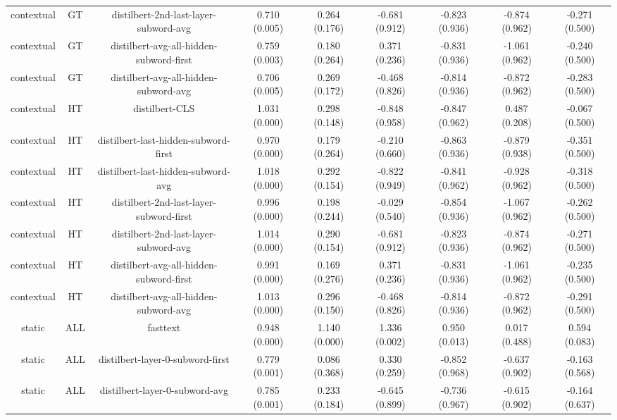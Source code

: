 \begin{sidewaystable}[htb]
\begin{tabular}{@{}ccccccccc@{}}
        contextual & GT & distilbert-2nd-last-layer-subword-avg & 0.710 (0.005) & 0.264 (0.176) & -0.681 (0.912) & -0.823 (0.936) & -0.874 (0.962) & -0.271 (0.500) \\
        contextual & GT & distilbert-avg-all-hidden-subword-first & 0.759 (0.003) & 0.180 (0.264) & 0.371 (0.236) & -0.831 (0.936) & -1.061 (0.962) & -0.240 (0.500) \\
        contextual & GT & distilbert-avg-all-hidden-subword-avg & 0.706 (0.005) & 0.269 (0.172) & -0.468 (0.826) & -0.814 (0.936) & -0.872 (0.962) & -0.283 (0.500) \\
        contextual & HT & distilbert-CLS & 1.031 (0.000) & 0.298 (0.148) & -0.848 (0.958) & -0.847 (0.962) & 0.487 (0.208) & -0.067 (0.500) \\
        contextual & HT & distilbert-last-hidden-subword-first & 0.970 (0.000) & 0.179 (0.264) & -0.210 (0.660) & -0.863 (0.936) & -0.879 (0.938) & -0.351 (0.500) \\
        contextual & HT & distilbert-last-hidden-subword-avg & 1.018 (0.000) & 0.292 (0.154) & -0.822 (0.949) & -0.841 (0.962) & -0.928 (0.962) & -0.318 (0.500) \\
        contextual & HT & distilbert-2nd-last-layer-subword-first & 0.996 (0.000) & 0.198 (0.244) & -0.029 (0.540) & -0.854 (0.936) & -1.067 (0.962) & -0.262 (0.500) \\
        contextual & HT & distilbert-2nd-last-layer-subword-avg & 1.014 (0.000) & 0.290 (0.154) & -0.681 (0.912) & -0.823 (0.936) & -0.874 (0.962) & -0.271 (0.500) \\
        contextual & HT & distilbert-avg-all-hidden-subword-first & 0.991 (0.000) & 0.169 (0.276) & 0.371 (0.236) & -0.831 (0.936) & -1.061 (0.962) & -0.235 (0.500) \\
        contextual & HT & distilbert-avg-all-hidden-subword-avg & 1.013 (0.000) & 0.296 (0.150) & -0.468 (0.826) & -0.814 (0.936) & -0.872 (0.962) & -0.291 (0.500) \\
        static & ALL & fasttext & 0.948 (0.000) & 1.140 (0.000) & 1.336 (0.002) & 0.950 (0.013) & 0.017 (0.488) & 0.594 (0.083) \\
        static & ALL & distilbert-layer-0-subword-first & 0.779 (0.001) & 0.086 (0.368) & 0.330 (0.259) & -0.852 (0.968) & -0.637 (0.902) & -0.163 (0.568) \\
        static & ALL & distilbert-layer-0-subword-avg & 0.785 (0.001) & 0.233 (0.184) & -0.645 (0.899) & -0.736 (0.967) & -0.615 (0.902) & -0.164 (0.637) \\

\end{tabular}
\end{sidewaystable}
